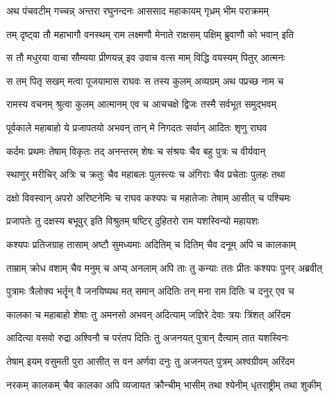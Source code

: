 
\twolineshloka
{अथ पंचवटीम् गच्चन्न् अन्तरा रघुनन्दनः}
{आससाद महाकायम् गृध्रम् भीम पराक्रमम्} %

\twolineshloka
{तम् दृष्ट्वा तौ महाभागौ वनस्थम् राम लक्ष्मणौ}
{मेनाते राक्षसम् पक्षिम् ब्रुवाणौ को भवान् इति} %

\twolineshloka
{स तौ मधुरया वाचा सौम्यया प्रीणयन्न् इव}
{उवाच वत्स माम् विद्धि वयस्यम् पितुर् आत्मनः} %

\twolineshloka
{स तम् पितृ सखम् मत्वा पूजयामास राघवः}
{स तस्य कुलम् अव्यग्रम् अथ पप्रच्छ नाम च} %

\twolineshloka
{रामस्य वचनम् श्रुत्वा कुलम् आत्मानम् एव च}
{आचचक्षे द्विजः तस्मै सर्वभूत समुद्भवम्} %

\twolineshloka
{पूर्वकाले महाबाहो ये प्रजापतयो अभवन्}
{तान् मे निगदतः सर्वान् आदितः शृणु राघव} %

\twolineshloka
{कर्दमः प्रथमः तेषाम् विकृतः तद् अनन्तरम्}
{शेषः च संश्रयः चैव बहु पुत्रः च वीर्यवान्} %

\twolineshloka
{स्थाणुर् मरीचिर् अत्रिः च क्रतुः चैव महाबलः}
{पुलस्त्यः च अंगिराः चैव प्रचेताः पुलहः तथा} %

\twolineshloka
{दक्षो विवस्वान् अपरो अरिष्टनेमिः च राघव}
{कश्यपः च महातेजाः तेषाम् आसीत् च पश्चिमः} %

\twolineshloka
{प्रजापतेः तु दक्षस्य बभूवुर् इति विश्रुतम्}
{षष्टिर् दुहितरो राम यशस्विन्यो महायशः} %

\twolineshloka
{कश्यपः प्रतिजग्राह तासाम् अष्टौ सुमध्यमाः}
{अदितिम् च दितिम् चैव दनूम् अपि च कालकाम्} %

\twolineshloka
{ताम्राम् क्रोध वशाम् चैव मनुम् च अप्य् अनलाम् अपि}
{ताः तु कन्याः ततः प्रीतः कश्यपः पुनर् अब्रवीत्} %

\twolineshloka
{पुत्रामः त्रैलोक्य भर्तॄन् वै जनयिष्यथ मत् समान्}
{अदितिः तन् मना राम दितिः च दनुर् एव च} %

\twolineshloka
{कालका च महाबाहो शेषाः तु अमनसो अभवन्}
{अदित्याम् जज्ञिरे देवाः त्रयः त्रिंशत् अरिंदम} %

\twolineshloka
{आदित्या वसवो रुद्रा अश्विनौ च परंतप}
{दितिः तु अजनयत् पुत्रान् दैत्याम् तात यशस्विनः} %

\twolineshloka
{तेषाम् इयम् वसुमती पुरा आसीत् स वन अर्णवा}
{दनुः तु अजनयत् पुत्रम् अश्वग्रीवम् अरिंदम} %

\twolineshloka
{नरकम् कालकम् चैव कालका अपि व्यजायत}
{क्रौन्चीम् भासीम् तथा श्येनीम् धृतराष्ट्रीम् तथा शुकीम्} %

